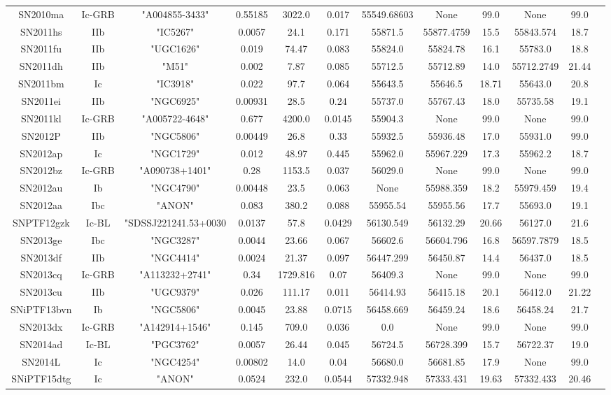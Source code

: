 \documentclass[onecolumn]{aa} %
\begin{document}
\begin{table*}
\begin{tabular}{cccccccccccc}
SN2010ma&Ic-GRB&"A004855-3433"&0.55185&3022.0&0.017&55549.68603&None&99.0&None&99.0\\ 
SN2011hs&IIb&"IC5267"&0.0057&24.1&0.171&55871.5&55877.4759&15.5&55843.574&18.7\\ 
SN2011fu&IIb&"UGC1626"&0.019&74.47&0.083&55824.0&55824.78&16.1&55783.0&18.8\\ 
SN2011dh&IIb&"M51"&0.002&7.87&0.085&55712.5&55712.89&14.0&55712.2749&21.44\\ 
SN2011bm&Ic&"IC3918"&0.022&97.7&0.064&55643.5&55646.5&18.71&55643.0&20.8\\ 
SN2011ei&IIb&"NGC6925"&0.00931&28.5&0.24&55737.0&55767.43&18.0&55735.58&19.1\\ 
SN2011kl&Ic-GRB&"A005722-4648"&0.677&4200.0&0.0145&55904.3&None&99.0&None&99.0\\ 
SN2012P&IIb&"NGC5806"&0.00449&26.8&0.33&55932.5&55936.48&17.0&55931.0&99.0\\ 
SN2012ap&Ic&"NGC1729"&0.012&48.97&0.445&55962.0&55967.229&17.3&55962.2&18.7\\ 
SN2012bz&Ic-GRB&"A090738+1401"&0.28&1153.5&0.037&56029.0&None&99.0&None&99.0\\ 
SN2012au&Ib&"NGC4790"&0.00448&23.5&0.063&None&55988.359&18.2&55979.459&19.4\\ 
SN2012aa&Ibc&"ANON"&0.083&380.2&0.088&55955.54&55955.56&17.7&55693.0&19.1\\ 
SNPTF12gzk&Ic-BL&"SDSSJ221241.53+0030&0.0137&57.8&0.0429&56130.549&56132.29&20.66&56127.0&21.6\\ 
SN2013ge&Ibc&"NGC3287"&0.0044&23.66&0.067&56602.6&56604.796&16.8&56597.7879&18.5\\ 
SN2013df&IIb&"NGC4414"&0.0024&21.37&0.097&56447.299&56450.87&14.4&56437.0&18.5\\ 
SN2013cq&Ic-GRB&"A113232+2741"&0.34&1729.816&0.07&56409.3&None&99.0&None&99.0\\ 
SN2013cu&IIb&"UGC9379"&0.026&111.17&0.011&56414.93&56415.18&20.1&56412.0&21.22\\ 
SNiPTF13bvn&Ib&"NGC5806"&0.0045&23.88&0.0715&56458.669&56459.24&18.6&56458.24&21.7\\ 
SN2013dx&Ic-GRB&"A142914+1546"&0.145&709.0&0.036&0.0&None&99.0&None&99.0\\ 
SN2014ad&Ic-BL&"PGC3762"&0.0057&26.44&0.045&56724.5&56728.399&15.7&56722.37&19.0\\ 
SN2014L&Ic&"NGC4254"&0.00802&14.0&0.04&56680.0&56681.85&17.9&None&99.0\\ 
SNiPTF15dtg&Ic&"ANON"&0.0524&232.0&0.0544&57332.948&57333.431&19.63&57332.433&20.46\\ 

\end{tabular}
\end{table*}
\end{document}
